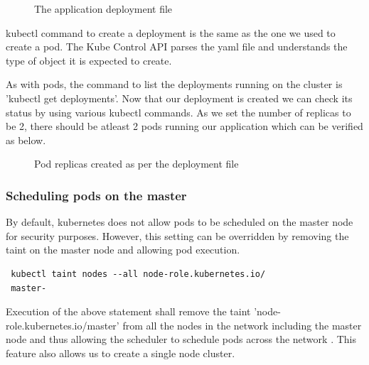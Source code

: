 \documentclass[9pt,twocolumn,twoside]{../../styles/osajnl}
\begin{document}
\begin{figure}[htbp]
\centering
{}
\caption{The application deployment file}
\label{The application deployment file}
\end{figure}

kubectl command to create a deployment is the same as the one we used
to create a pod. The Kube Control API parses the yaml file and
understands the type of object it is expected to create.

As with pods, the command to list the deployments running on the
cluster is 'kubectl get deployments'. Now that our deployment is
created we can check its status by using various kubectl commands. As
we set the number of replicas to be 2, there should be atleast 2 pods
running our application which can be verified as below.

\begin{figure}[htbp]
\centering
{}
\caption{Pod replicas created as per the deployment file}
\label{Pod replicas created as per the deployment file}
\end{figure}

\subsubsection{Scheduling pods on the master}
By default, kubernetes does not allow pods to be
scheduled on the master node for security purposes. However, this
setting can be overridden by removing the taint on the master node and
allowing pod execution.

\begin{verbatim}
 kubectl taint nodes --all node-role.kubernetes.io/
 master-
\end{verbatim}

Execution of the above statement shall remove the taint
'node-role.kubernetes.io/master' from all the nodes in the network
including the master node and thus allowing the scheduler to schedule
pods across the network \cite{www-kubernetes-kubeadm}. This feature
also allows us to create a single node cluster.
\end{document}
